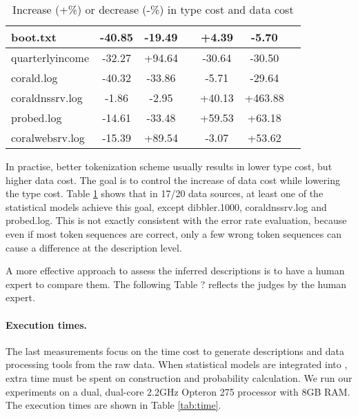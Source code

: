 \begin{table}
\begin{center}
\begin{tabular}{|l||c|c|c||c|c|c|}
boot.txt & -40.85 & -19.49 & & +4.39 & -5.70 &  \\ \hline
quarterlyincome & -32.27 & +94.64 & & -30.64 & -30.50 &     \\ \hline
corald.log & -40.32 & -33.86 & & -5.71 & -29.64 &    \\ \hline
coraldnssrv.log  & -1.86 & -2.95 & & +40.13 & +463.88 &  \\ \hline
probed.log & -14.61 & -33.48 & & +59.53 & +63.18 & \\ \hline
coralwebsrv.log & -15.39 & +89.54 & & -3.07 & +53.62 &    \\
               \hline
\end{tabular}
\caption{Increase (+\%) or decrease (-\%) in type cost and data cost}
\label{tab:complexity}
\end{center}
\end{table}

In practise, better tokenization scheme usually results in lower
type cost, but higher data cost. The goal is to control the increase
of data cost while lowering the type cost. Table \ref{tab:complexity}
shows that in 17/20 data sources, at least one of the statistical
models achieve this goal, except dibbler.1000, coraldnssrv.log and
probed.log. This is not exactly consistent with the error rate
evaluation, because even if most token sequences are correct, only a
few wrong token sequences can cause a difference at the description
level.

A more effective approach to assess the inferred descriptions is to
have a human expert to compare them. The following Table ? reflects
the judges by the human expert.


\paragraph*{Execution times.}

The last measurements focus on the time cost to generate descriptions
and data processing tools from the raw data. When statistical models
are integrated into \learnpads{}, extra time must be spent on
\seqset{} construction and probability calculation. We run our
experiments on a dual, dual-core 2.2GHz Opteron 275 processor with 8GB
RAM. The execution times are shown in Table \ref{tab:time}.

